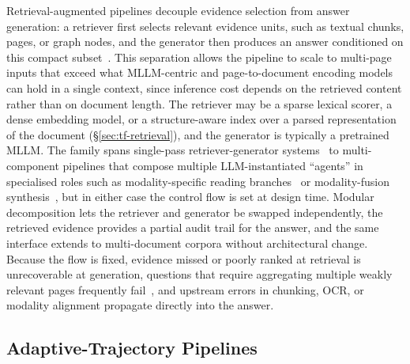 Retrieval-augmented pipelines decouple evidence selection from answer generation: a retriever first selects relevant evidence units, such as textual chunks, pages, or graph nodes, and the generator then produces an answer conditioned on this compact subset~\cite{cho2024m3docrag, tanaka2025vdocrag}. This separation allows the pipeline to scale to multi-page inputs that exceed what MLLM-centric and page-to-document encoding models can hold in a single context, since inference cost depends on the retrieved content rather than on document length. The retriever may be a sparse lexical scorer, a dense embedding model, or a structure-aware index over a parsed representation of the document (\S\ref{sec:tf-retrieval}), and the generator is typically a pretrained MLLM. The family spans single-pass retriever-generator systems~\cite{cho2024m3docrag} to multi-component pipelines that compose multiple LLM-instantiated ``agents'' in specialised roles such as modality-specific reading branches~\cite{han2025mdocagent} or modality-fusion synthesis~\cite{duan2025m2rag}, but in either case the control flow is set at design time. Modular decomposition lets the retriever and generator be swapped independently, the retrieved evidence provides a partial audit trail for the answer, and the same interface extends to multi-document corpora without architectural change. Because the flow is fixed, evidence missed or poorly ranked at retrieval is unrecoverable at generation, questions that require aggregating multiple weakly relevant pages frequently fail~\cite{wu2025molorag}, and upstream errors in chunking, OCR, or modality alignment propagate directly into the answer.

\subsection{Adaptive-Trajectory Pipelines} 
\label{sec:arch-agent}

